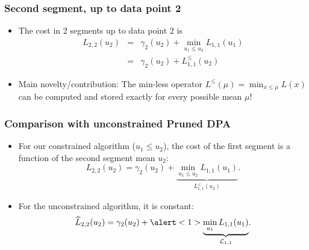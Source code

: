 \documentclass{beamer}
\begin{document}
\begin{frame}[fragile]
  \frametitle{Second segment, up to data point 2}
  \begin{itemize}
  \item The cost in 2 segments up to data point 2 is
\begin{eqnarray*}
  L_{2,2}(u_2) 
  &=&  \gamma_2(u_2)+\min_{u_1 \leq u_2} L_{1,1}(u_1)\\
  &=& \gamma_2(u_2)+L_{1,1}^{\leq}(u_2)
\end{eqnarray*} 
\item Main novelty/contribution: The min-less operator
  $L^\leq(\mu) = \min_{x\leq\mu} L(x)$ can be computed and stored
  exactly for every possible mean $\mu$!
    \begin{center}
      
    \end{center}
\end{itemize}
\end{frame}

\begin{frame}
  \frametitle{Comparison with unconstrained Pruned DPA}
  \begin{itemize}
  \item For our constrained algorithm ($u_1\leq u_2$), the cost of the first
    segment is a function of the second segment mean $u_2$:
    \begin{equation*}
      L_{2,2}(u_2) = \gamma_2(u_2)+
      \underbrace{\min_{u_1 \leq u_2} L_{1,1}(u_1)}_{L^\leq_{1,1}(u_2)}.
    \end{equation*}
  \item For the unconstrained algorithm, it is \alert<1>{constant}:
    \begin{equation*}
      \widehat{L}_{2,2}(u_2) = \gamma_2(u_2)+
      \alert<1>{\underbrace{\min_{u_1} L_{1,1}(u_1)}_{\mathcal L_{1,1}}}.
    \end{equation*}
  \end{itemize}
  \vskip -1cm
  \hskip -1cm 
  
\end{frame}
\end{document}
